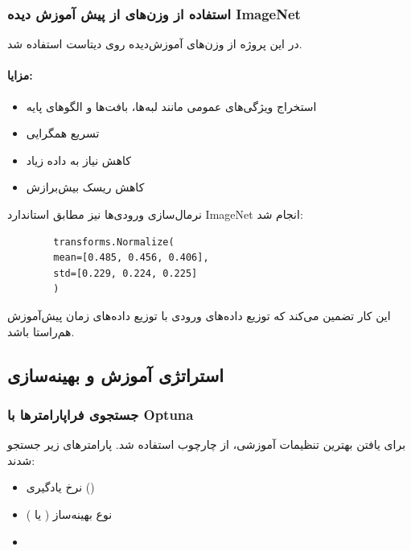 \documentclass{article}
\begin{document}

\subsubsection{استفاده از وزن‌های از پیش آموزش دیده ImageNet}

در این پروژه از وزن‌های آموزش‌دیده روی دیتاست  استفاده شد.

\paragraph{مزایا:}

\begin{itemize}
	\item استخراج ویژگی‌های عمومی مانند لبه‌ها، بافت‌ها و الگوهای پایه
	\item تسریع همگرایی
	\item کاهش نیاز به داده زیاد
	\item کاهش ریسک بیش‌برازش
\end{itemize}

نرمال‌سازی ورودی‌ها نیز مطابق استاندارد ImageNet انجام شد:

\begin{LTR}
	\begin{verbatim}
		transforms.Normalize(
		mean=[0.485, 0.456, 0.406],
		std=[0.229, 0.224, 0.225]
		)
	\end{verbatim}
\end{LTR}

این کار تضمین می‌کند که توزیع داده‌های ورودی با توزیع داده‌های زمان پیش‌آموزش هم‌راستا باشد.


\subsection{استراتژی آموزش و بهینه‌سازی}

\subsubsection{جستجوی فراپارامترها با Optuna}

برای یافتن بهترین تنظیمات آموزشی، از چارچوب  استفاده شد. 
پارامترهای زیر جستجو شدند:

\begin{itemize}
	\item نرخ یادگیری ()
	\item نوع بهینه‌ساز ( یا )
	\item {}
\end{itemize}
\end{document}
